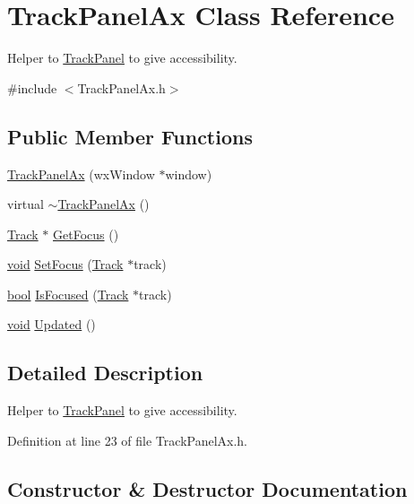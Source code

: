 \hypertarget{class_track_panel_ax}{}\section{Track\+Panel\+Ax Class Reference}
\label{class_track_panel_ax}


Helper to \hyperlink{class_track_panel}{Track\+Panel} to give accessibility.  




{\ttfamily \#include $<$Track\+Panel\+Ax.\+h$>$}

\subsection*{Public Member Functions}
\begin{DoxyCompactItemize}
\item 
\hyperlink{class_track_panel_ax_aa99228863640e12677395226e36f0eff}{Track\+Panel\+Ax} (wx\+Window $\ast$window)
\item 
virtual \hyperlink{class_track_panel_ax_a466919c7b06c0a73db8c7a48c1bac1d4}{$\sim$\+Track\+Panel\+Ax} ()
\item 
\hyperlink{class_track}{Track} $\ast$ \hyperlink{class_track_panel_ax_ac12db52636270d92d7dbb7ac3bb8b2ea}{Get\+Focus} ()
\item 
\hyperlink{sound_8c_ae35f5844602719cf66324f4de2a658b3}{void} \hyperlink{class_track_panel_ax_aba4b3db82870f8c9856c3fd62d2c3f3e}{Set\+Focus} (\hyperlink{class_track}{Track} $\ast$track)
\item 
\hyperlink{mac_2config_2i386_2lib-src_2libsoxr_2soxr-config_8h_abb452686968e48b67397da5f97445f5b}{bool} \hyperlink{class_track_panel_ax_a4301f83ada002e0605da20a5441e8f36}{Is\+Focused} (\hyperlink{class_track}{Track} $\ast$track)
\item 
\hyperlink{sound_8c_ae35f5844602719cf66324f4de2a658b3}{void} \hyperlink{class_track_panel_ax_adb7e2ddf8acf8bddb5401b7ac0f99f1e}{Updated} ()
\end{DoxyCompactItemize}


\subsection{Detailed Description}
Helper to \hyperlink{class_track_panel}{Track\+Panel} to give accessibility. 

Definition at line 23 of file Track\+Panel\+Ax.\+h.



\subsection{Constructor \& Destructor Documentation}
